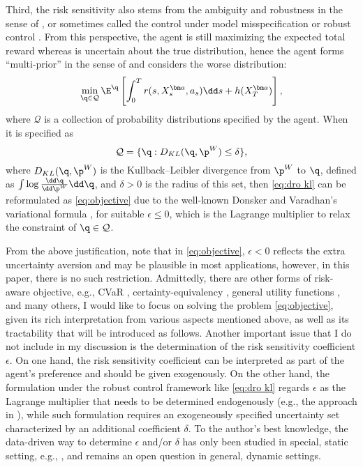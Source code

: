 Third, the risk sensitivity also stems from the ambiguity and robustness in the sense of \cite{hansen2011robustness}, or sometimes called the control under model misspecification \citep{hansen2001robust} or robust control \citep{dupuis2000robust}. From this perspective, the agent is still maximizing the expected total reward whereas is uncertain about the true distribution, hence the agent forms ``multi-prior'' in the sense of \cite{gilboa1989maxmin} and considers the worse distribution:
\begin{equation}
	\label{eq:dro kl}
	\min_{\q \in \mathcal{Q}}\E^{\q}\left[ \int_0^T r(s, X_s^{\bm a}, a_s)\dd s + h(X_T^{\bm a}) \right] ,
\end{equation}
where $\mathcal Q$ is a collection of probability distributions specified by the agent. When it is specified as 
\[ \mathcal Q = \{ \q: D_{KL}(\q, \p^W) \leq \delta \}, \]
where $D_{KL}(\q,\p^W)$ is the Kullback–Leibler divergence from $\p^W$ to $\q$, defined as $\int \log\frac{\dd \q}{\dd \p^W} \dd \q$, and $\delta > 0$ is the radius of this set, then \eqref{eq:dro kl} can be reformulated as \eqref{eq:objective} due to the well-known Donsker and Varadhan's variational formula \citep{donsker1983asymptotic}, for suitable $\epsilon \leq 0$, which is the Lagrange multiplier to relax the constraint of $\q\in \mathcal Q$.


From the above justification, note that in \eqref{eq:objective}, $\epsilon < 0$ reflects the extra uncertainty aversion and may be plausible in most applications, however, in this paper, there is no such restriction. Admittedly, there are other forms of risk-aware objective, e.g., CVaR \citep{chow2015risk}, certainty-equivalency \citep{xu2023regret}, general utility functions \citep{wu2023risk}, and many others, I would like to focus on solving the problem \eqref{eq:objective}, given its rich interpretation from various aspects mentioned above, as well as its tractability that will be introduced as follows. Another important issue that I do not include in my discussion is the determination of the risk sensitivity coefficient $\epsilon$. On one hand, the risk sensitivity coefficient can be interpreted as part of the agent's preference and should be given exogenously. On the other hand, the formulation under the robust control framework like \eqref{eq:dro kl} regards $\epsilon$ as the Lagrange multiplier that needs to be determined endogenously (e.g., the approach in \citealt{wang2023finite}), while such formulation requires an exogeneously specified uncertainty set characterized by an additional coefficient $\delta$. To the author's best knowledge, the data-driven way to determine $\epsilon$ and/or $\delta$ has only been studied in special, static setting, e.g., \citet{blanchet2022distributionally}, and remains an open question in general, dynamic settings.


